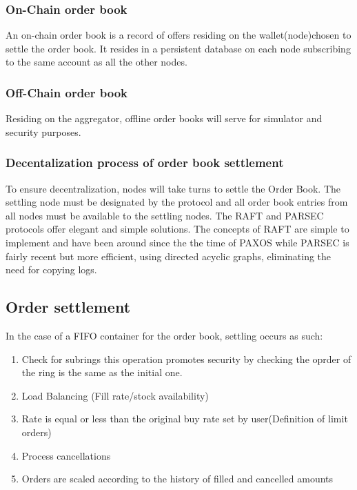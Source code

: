 \documentclass[]{article}
\begin{document}
\subsubsection{On-Chain order book}
An on-chain order book is a record of offers residing on the wallet(node)chosen to settle
the order book. It resides in a persistent database on each node subscribing 
to the same account as all the other nodes.

\subsubsection{Off-Chain order book}
Residing on the aggregator, offline order books will serve for simulator and security purposes.


\subsubsection{Decentalization process of order book settlement}
To ensure decentralization, nodes will take turns to settle the Order Book. 
The settling node must be designated by the protocol and all order book entries from all nodes must be available to the settling nodes. The RAFT\cite{18} and PARSEC\cite{23} protocols
offer elegant and simple solutions. The concepts of RAFT are simple to implement and have been around since the the time of PAXOS\cite{24} while PARSEC is fairly recent but more efficient, using directed acyclic graphs, eliminating the need for copying logs.

\subsection{Order settlement}
In the case of a FIFO container for the order book,
settling occurs as such:
\begin{enumerate}
	\item Check for subrings
	this operation promotes security by checking the oprder of the ring is the same as the initial one.
	\item Load Balancing (Fill rate/stock availability)
	\item Rate is equal or less than the original buy rate set by user(Definition of limit orders)
	\item Process cancellations\\
	\item Orders are scaled according to the history of filled and cancelled amounts\\	 
\end{enumerate}	
	
\end{document}
